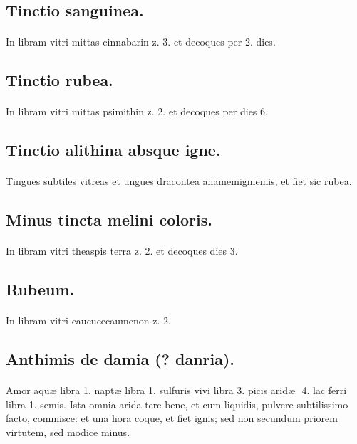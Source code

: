 \documentclass[a4paper, 11pt, oneside, polutonikogreek, italian]{article}
\newcommand*\svgaaa{}
\begin{document}
\subsection{Tinctio sanguinea.}
\paragraph{}
In libram vitri mittas cinnabarin z. 3. et decoques per 2. dies.

\subsection{Tinctio rubea.}
\paragraph{}
In libram vitri mittas psimithin z. 2. et decoques per dies 6.

\subsection{Tinctio alithina absque igne.}
\paragraph{}
Tingues subtiles vitreas et ungues dracontea anamemigmemis, et fiet sic rubea.

\subsection{Minus tincta melini coloris.}
\paragraph{}
In libram vitri theaspis terra z. 2. et decoques dies 3.

\subsection{Rubeum.}
\paragraph{}
In libram vitri caucucecaumenon z. 2.

\subsection{Anthimis de damia (? danria).}
\paragraph{}
Amor aquæ libra 1. naptæ libra 1. sulfuris vivi libra 3. picis aridæ $\svgaaa$ 4. lac ferri libra 1. semis. Ista omnia arida tere bene, et cum liquidis, pulvere subtilissimo facto, commisce: et una hora coque, et fiet ignis; sed non secundum priorem virtutem, sed modice minus.
\end{document}

